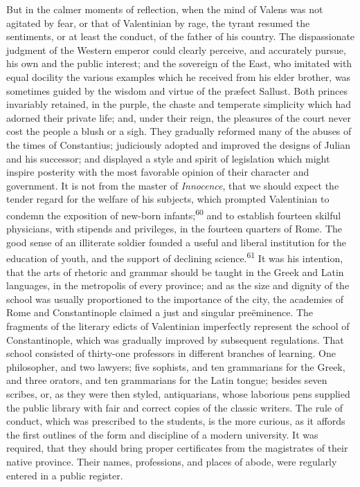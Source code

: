 But in the calmer moments of reflection, when the mind of Valens
was not agitated by fear, or that of Valentinian by rage, the
tyrant resumed the sentiments, or at least the conduct, of the
father of his country. The dispassionate judgment of the Western
emperor could clearly perceive, and accurately pursue, his own
and the public interest; and the sovereign of the East, who
imitated with equal docility the various examples which he
received from his elder brother, was sometimes guided by the
wisdom and virtue of the præfect Sallust. Both princes invariably
retained, in the purple, the chaste and temperate simplicity
which had adorned their private life; and, under their reign, the
pleasures of the court never cost the people a blush or a sigh.
They gradually reformed many of the abuses of the times of
Constantius; judiciously adopted and improved the designs of
Julian and his successor; and displayed a style and spirit of
legislation which might inspire posterity with the most favorable
opinion of their character and government. It is not from the
master of \textit{Innocence}, that we should expect the tender regard
for the welfare of his subjects, which prompted Valentinian to
condemn the exposition of new-born infants;\textsuperscript{60} and to establish
fourteen skilful physicians, with stipends and privileges, in the
fourteen quarters of Rome. The good sense of an illiterate
soldier founded a useful and liberal institution for the
education of youth, and the support of declining science.\textsuperscript{61} It
was his intention, that the arts of rhetoric and grammar should
be taught in the Greek and Latin languages, in the metropolis of
every province; and as the size and dignity of the school was
usually proportioned to the importance of the city, the academies
of Rome and Constantinople claimed a just and singular
preëminence. The fragments of the literary edicts of Valentinian
imperfectly represent the school of Constantinople, which was
gradually improved by subsequent regulations. That school
consisted of thirty-one professors in different branches of
learning. One philosopher, and two lawyers; five sophists, and
ten grammarians for the Greek, and three orators, and ten
grammarians for the Latin tongue; besides seven scribes, or, as
they were then styled, antiquarians, whose laborious pens
supplied the public library with fair and correct copies of the
classic writers. The rule of conduct, which was prescribed to the
students, is the more curious, as it affords the first outlines
of the form and discipline of a modern university. It was
required, that they should bring proper certificates from the
magistrates of their native province. Their names, professions,
and places of abode, were regularly entered in a public register.

